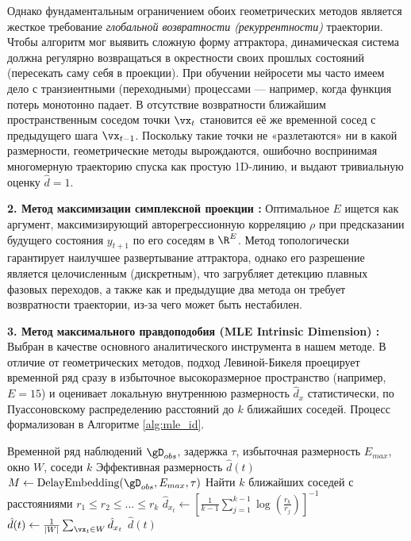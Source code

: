 \documentclass{article}
\begin{document}
Однако фундаментальным ограничением обоих геометрических методов является жесткое требование \textit{глобальной возвратности (рекуррентности)} траектории. Чтобы алгоритм мог выявить сложную форму аттрактора, динамическая система должна регулярно возвращаться в окрестности своих прошлых состояний (пересекать саму себя в проекции). При обучении нейросети мы часто имеем дело с транзиентными (переходными) процессами — например, когда функция потерь монотонно падает. В отсутствие возвратности ближайшим пространственным соседом точки $\vx_t$ становится её же временной сосед с предыдущего шага $\vx_{t-1}$. Поскольку такие точки не «разлетаются» ни в какой размерности, геометрические методы вырождаются, ошибочно воспринимая многомерную траекторию спуска как простую 1D-линию, и выдают тривиальную оценку $\hat{d}=1$.

\textbf{2. Метод максимизации симплексной проекции \cite{sugihara1990nonlinear}:}
Оптимальное $E$ ищется как аргумент, максимизирующий авторегрессионную корреляцию $\rho$ при предсказании будущего состояния $y_{t+1}$ по его соседям в $\R^E$. Метод топологически гарантирует наилучшее развертывание аттрактора, однако его разрешение является целочисленным (дискретным), что загрубляет детекцию плавных фазовых переходов, а также как и предыдущие два метода он требует возвратности траектории, из-за чего может быть нестабилен.

\textbf{3. Метод максимального правдоподобия (MLE Intrinsic Dimension) \cite{levina2004maximum}:}
Выбран в качестве основного аналитического инструмента в нашем методе. В отличие от геометрических методов, подход Левиной-Бикеля проецирует временной ряд сразу в избыточное высокоразмерное пространство (например, $E=15$) и оценивает локальную внутреннюю размерность $\hat{d}_{x}$ статистически, по Пуассоновскому распределению расстояний до $k$ ближайших соседей. Процесс формализован в Алгоритме \ref{alg:mle_id}.

\begin{algorithm}[htbp]
\caption{Оценка динамической размерности MLE (Levina-Bickel)}\label{alg:mle_id}
\begin{algorithmic}[1]
\Input Временной ряд наблюдений $\gD_{obs}$, задержка $\tau$, избыточная размерность $E_{max}$, окно $W$, соседи $k$
\Output Эффективная размерность $\hat{d}(t)$
\State $M \gets \text{DelayEmbedding}(\gD_{obs}, E_{max}, \tau)$ 
    \State Найти $k$ ближайших соседей с расстояниями $r_1 \le r_2 \le \dots \le r_k$
    \State $\hat{d}_{x_t} \gets \left[ \frac{1}{k-1} \sum_{j=1}^{k-1} \log \left( \frac{r_k}{r_j} \right) \right]^{-1}$ 
\EndFor
\State $\hat{d}(t) \gets \frac{1}{|W|} \sum_{\vx_t \in W} \hat{d}_{x_t}$ 
\State \Return $\hat{d}(t)$
\end{algorithmic}
\end{algorithm}
\end{document}
